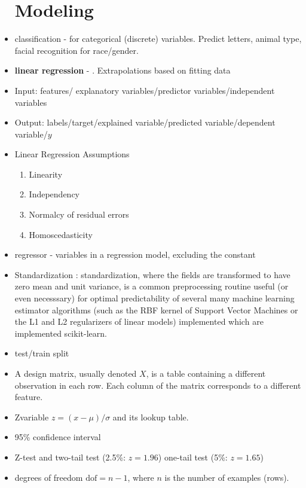 \documentclass[11pt, oneside]{article}   	%
\begin{document}
\begin{itemize}
\section{Modeling}
\item  classification - for categorical (discrete) variables. Predict letters, animal type, facial
recognition for race/gender.
\item \textbf{linear regression} - . Extrapolations based on fitting data
\item Input:  features/ explanatory variables/predictor variables/independent variables
\item Output:  labels/target/explained variable/predicted variable/dependent variable/$y$
\item  Linear Regression Assumptions
\begin{enumerate}
\item Linearity
\item Independency
\item Normalcy of residual errors 
\item Homoscedasticity
\end{enumerate}
\item regressor -  variables in a regression model, excluding the constant
\item Standardization : standardization, where the fields are transformed to have zero mean and unit variance, is a common preprocessing routine useful (or even necesssary) for optimal predictability of several many machine learning estimator algorithms (such as the RBF kernel of Support Vector Machines or the L1 and L2 regularizers of linear models) implemented which are implemented scikit-learn. 
\item test/train split
\item  A design
matrix, usually denoted $X$, is a table containing a diﬀerent observation in each row. Each column of the
matrix corresponds to a diﬀerent feature. 
\item Z\-variable $z=(x-\mu)/{\sigma}$ and its lookup table. 
\item 95\% confidence interval
\item Z-test and two-tail test (2.5\%: $z = 1.96$) one-tail test (5\%: $z = 1.65$) 
\item degrees of freedom $\mathrm{dof}=n-1$, where $n$ is the number of examples (rows).


\end{itemize}
\end{document}
